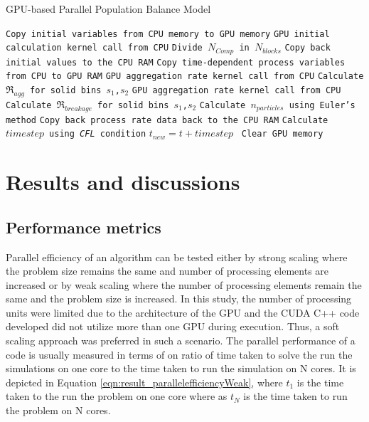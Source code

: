 \documentclass[preprint,10pt,authoryear,review]{elsarticle}
\begin{document}
\begin{algorithm}
     \scriptsize
     \caption{GPU-based Parallel Population Balance Model}
     \label{alg:GPUparallelPBM}
     \begin{algorithmic}[1]
     \State\texttt{Copy initial variables from CPU memory to GPU memory}
     \State \texttt{GPU initial calculation kernel call from CPU}
     \State \texttt{Divide $N_{Comp}$ in $N_{blocks}$}
     \State \texttt{Copy back initial values to the CPU RAM}
	 \State \texttt{Copy time-dependent process variables from CPU to GPU RAM}
     \State \texttt{GPU aggregation rate kernel call from CPU}
     \State \texttt{Calculate $\Re_{agg}$ for solid bins $s_1$,$s_2$}
	 \State \texttt{GPU aggregation rate kernel call from CPU}     
     \State \texttt{Calculate $\Re_{breakage}$ for solid bins $s_1$,$s_2$}
     \State \texttt{Calculate $n_{particles}$ using Euler's method}
     \State \texttt{Copy back process rate data back to the CPU RAM}
     \State \texttt{Calculate $timestep$ using \textit{CFL} condition}
     \State \texttt{$t_{new} = t + timestep$ }
     \EndWhile
     \State \texttt{Clear GPU memory}
     \EndProcedure
     \end{algorithmic}
 \end{algorithm}

\section{Results and discussions}
\label{secResults}
 \subsection{Performance metrics}
Parallel efficiency of an algorithm can be tested either by strong scaling 
where the problem size remains the same and number of processing elements 
are increased or by weak scaling where the number of processing elements 
remain the same and the problem size is increased. In this study, the 
number of processing units were limited due to the architecture of the 
GPU and the CUDA C++ code developed did not utilize more than one GPU 
during execution. Thus, a soft scaling approach was preferred in such a 
scenario. The parallel performance of a code is usually measured in 
terms of on ratio of time taken to solve the run the simulations on one 
core to the time taken to run the simulation on N cores. It is depicted in
Equation \ref{eqn:result_parallelefficiencyWeak}, where $t_1$ is the time taken 
to the run the problem on one core where as $t_N$ is the time taken to 
run the problem on N cores.
\end{document}
